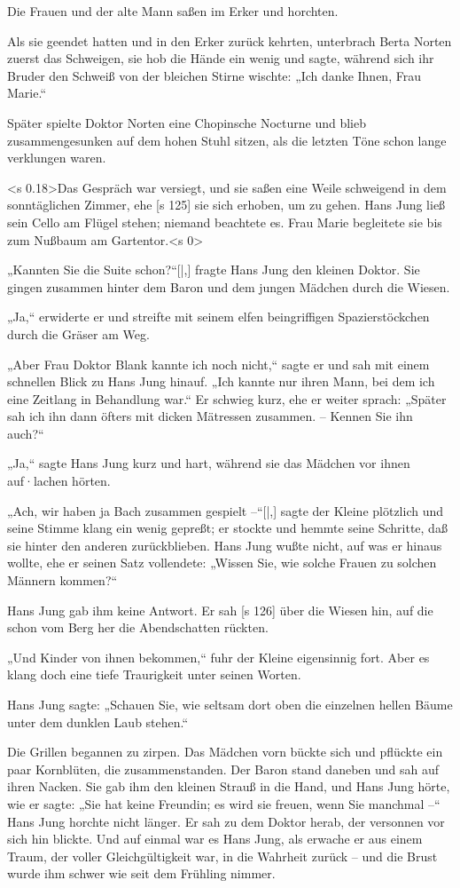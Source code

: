 Die Frauen und der alte Mann saßen im Erker
und horchten.

Als sie geendet hatten und in den Erker zurück­
kehrten, unterbrach Berta Norten zuerst das Schweigen,
sie hob die Hände ein wenig und sagte, während
sich ihr Bruder den Schweiß von der bleichen Stirne
wischte: „Ich danke Ihnen, Frau Marie.“

Später spielte Doktor Norten eine Chopinsche
Nocturne und blieb zusammengesunken auf dem
hohen Stuhl sitzen, als die letzten Töne schon lange
verklungen waren.

<s 0.18>Das Gespräch war versiegt, und sie saßen eine
Weile schweigend in dem sonntäglichen Zimmer, ehe
[s 125]
sie sich erhoben, um zu gehen. Hans Jung ließ sein
Cello am Flügel stehen; niemand beachtete es. Frau
Marie begleitete sie bis zum Nußbaum am Gartentor.<s 0>

„Kannten Sie die Suite schon?“[|,] fragte Hans Jung
den kleinen Doktor. Sie gingen zusammen hinter
dem Baron und dem jungen Mädchen durch die Wiesen.

„Ja,“ erwiderte er und streifte mit seinem elfen­
beingriffigen Spazierstöckchen durch die Gräser am
Weg.

„Aber Frau Doktor Blank kannte ich noch nicht,“
sagte er und sah mit einem schnellen Blick zu Hans
Jung hinauf. „Ich kannte nur ihren Mann, bei dem
ich eine Zeitlang in Behandlung war.“ Er schwieg
kurz, ehe er weiter sprach: „Später sah ich ihn dann
öfters mit dicken Mätressen zusammen. – Kennen
Sie ihn auch?“

„Ja,“ sagte Hans Jung kurz und hart, während
sie das Mädchen vor ihnen auf·lachen hörten.

„Ach, wir haben ja Bach zusammen gespielt –“[|,]
sagte der Kleine plötzlich und seine Stimme klang
ein wenig gepreßt; er stockte und hemmte seine
Schritte, daß sie hinter den anderen zurückblieben.
Hans Jung wußte nicht, auf was er hinaus wollte,
ehe er seinen Satz vollendete: „Wissen Sie, wie
solche Frauen zu solchen Männern kommen?“

Hans Jung gab ihm keine Antwort. Er sah
[s 126]
über die Wiesen hin, auf die schon vom Berg her
die Abendschatten rückten.

„Und Kinder von ihnen bekommen,“ fuhr der
Kleine eigensinnig fort. Aber es klang doch eine
tiefe Traurigkeit unter seinen Worten.

Hans Jung sagte: „Schauen Sie, wie seltsam
dort oben die einzelnen hellen Bäume unter dem
dunklen Laub stehen.“

Die Grillen begannen zu zirpen. Das Mädchen
vorn bückte sich und pflückte ein paar Kornblüten,
die zusammenstanden. Der Baron stand daneben
und sah auf ihren Nacken. Sie gab ihm den kleinen
Strauß in die Hand, und Hans Jung hörte, wie er
sagte: „Sie hat keine Freundin; es wird sie freuen,
wenn Sie manchmal –“ Hans Jung horchte nicht
länger. Er sah zu dem Doktor herab, der versonnen
vor sich hin blickte. Und auf einmal war es Hans
Jung, als erwache er aus einem Traum, der voller
Gleichgültigkeit war, in die Wahrheit zurück – und
die Brust wurde ihm schwer wie seit dem Frühling
nimmer.

